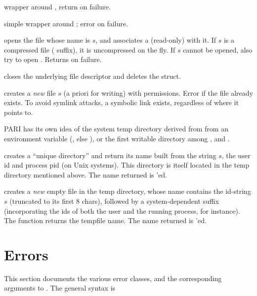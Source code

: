  wrapper
around , return  on failure.

simple wrapper around ; error on failure.

 opens the file whose name is
$s$,  and associates a (read-only)  with it. If $s$ is a
compressed file ( suffix), it is uncompressed on the fly.
If $s$ cannot be opened, also try to open . Returns 
on failure.

 closes
the underlying file descriptor and deletes the  struct.

creates a \emph{new} file $s$ (a priori for writing) with 
permissions. Error if the file already exists. To avoid symlink attacks,
a symbolic link exists, regardless of where it points to.


PARI has its own idea of the system temp directory derived from from an
environment variable (, else ), or the first
writable directory among ,  and .

 creates a ``unique directory''
and return its name built from the string $s$, the user id and process pid
(on Unix systems). This directory is itself located in the temp
directory mentioned above. The name returned is 'ed.

 creates a \emph{new} empty
file in the temp directory, whose name contains the id-string $s$ (truncated
to its first $8$ chars), followed by a system-dependent suffix (incorporating
the ids of both the user and the running process, for instance). The function
returns the tempfile name. The name returned is 'ed.

\section{Errors}\label{se:errors}

This section documents the various error classes, and the corresponding
arguments to . The general syntax is


